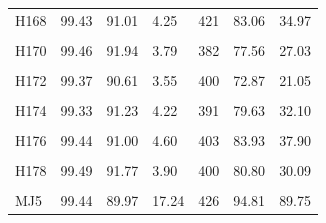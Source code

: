 \documentclass[
  a4paper,
  titlepage]{article}
\begin{document}
\begin{longtable}[t]{lllllll}
H168 & 99.43 & 91.01 & 4.25 & 421 & 83.06 & 34.97\\
 
\cellcolor{gray!6}{H169} & \cellcolor{gray!6}{99.43} & \cellcolor{gray!6}{92.04} & \cellcolor{gray!6}{3.57} & \cellcolor{gray!6}{417} & \cellcolor{gray!6}{82.65} & \cellcolor{gray!6}{28.68}\\
 
H170 & 99.46 & 91.94 & 3.79 & 382 & 77.56 & 27.03\\
 
\cellcolor{gray!6}{H171} & \cellcolor{gray!6}{99.44} & \cellcolor{gray!6}{91.03} & \cellcolor{gray!6}{4.68} & \cellcolor{gray!6}{412} & \cellcolor{gray!6}{84.60} & \cellcolor{gray!6}{39.98}\\
 
H172 & 99.37 & 90.61 & 3.55 & 400 & 72.87 & 21.05\\
 
\cellcolor{gray!6}{H173} & \cellcolor{gray!6}{99.44} & \cellcolor{gray!6}{91.45} & \cellcolor{gray!6}{3.48} & \cellcolor{gray!6}{416} & \cellcolor{gray!6}{77.60} & \cellcolor{gray!6}{24.03}\\
 
H174 & 99.33 & 91.23 & 4.22 & 391 & 79.63 & 32.10\\
 
\cellcolor{gray!6}{H175} & \cellcolor{gray!6}{99.43} & \cellcolor{gray!6}{90.81} & \cellcolor{gray!6}{3.75} & \cellcolor{gray!6}{418} & \cellcolor{gray!6}{79.73} & \cellcolor{gray!6}{27.22}\\
 
H176 & 99.44 & 91.00 & 4.60 & 403 & 83.93 & 37.90\\
 
\cellcolor{gray!6}{H177} & \cellcolor{gray!6}{99.37} & \cellcolor{gray!6}{93.26} & \cellcolor{gray!6}{3.28} & \cellcolor{gray!6}{344} & \cellcolor{gray!6}{81.52} & \cellcolor{gray!6}{26.63}\\
 
H178 & 99.49 & 91.77 & 3.90 & 400 & 80.80 & 30.09\\
 
\cellcolor{gray!6}{H179} & \cellcolor{gray!6}{99.39} & \cellcolor{gray!6}{91.26} & \cellcolor{gray!6}{3.44} & \cellcolor{gray!6}{427} & \cellcolor{gray!6}{79.53} & \cellcolor{gray!6}{24.69}\\
 
MJ5 & 99.44 & 89.97 & 17.24 & 426 & 94.81 & 89.75\\*
\end{longtable}
\end{document}
